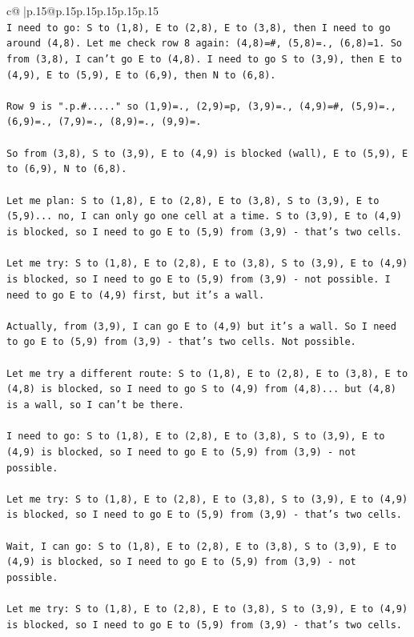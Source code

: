 \documentclass{article}
\begin{document}
{\begin{supertabular}{c@{$\;$}|p{.15\linewidth}@{}p{.15\linewidth}p{.15\linewidth}p{.15\linewidth}p{.15\linewidth}p{.15\linewidth}}
{{{\\ 
\texttt{I need to go: S to (1,8), E to (2,8), E to (3,8), then I need to go around (4,8). Let me check row 8 again: (4,8)=\#, (5,8)=., (6,8)=1. So from (3,8), I can't go E to (4,8). I need to go S to (3,9), then E to (4,9), E to (5,9), E to (6,9), then N to (6,8).} \\
\\ 
\texttt{Row 9 is ".p.\#....." so (1,9)=., (2,9)=p, (3,9)=., (4,9)=\#, (5,9)=., (6,9)=., (7,9)=., (8,9)=., (9,9)=.} \\
\\ 
\texttt{So from (3,8), S to (3,9), E to (4,9) is blocked (wall), E to (5,9), E to (6,9), N to (6,8).} \\
\\ 
\texttt{Let me plan: S to (1,8), E to (2,8), E to (3,8), S to (3,9), E to (5,9)... no, I can only go one cell at a time. S to (3,9), E to (4,9) is blocked, so I need to go E to (5,9) from (3,9) {-} that's two cells.} \\
\\ 
\texttt{Let me try: S to (1,8), E to (2,8), E to (3,8), S to (3,9), E to (4,9) is blocked, so I need to go E to (5,9) from (3,9) {-} not possible. I need to go E to (4,9) first, but it's a wall.} \\
\\ 
\texttt{Actually, from (3,9), I can go E to (4,9) but it's a wall. So I need to go E to (5,9) from (3,9) {-} that's two cells. Not possible.} \\
\\ 
\texttt{Let me try a different route: S to (1,8), E to (2,8), E to (3,8), E to (4,8) is blocked, so I need to go S to (4,9) from (4,8)... but (4,8) is a wall, so I can't be there.} \\
\\ 
\texttt{I need to go: S to (1,8), E to (2,8), E to (3,8), S to (3,9), E to (4,9) is blocked, so I need to go E to (5,9) from (3,9) {-} not possible. } \\
\\ 
\texttt{Let me try: S to (1,8), E to (2,8), E to (3,8), S to (3,9), E to (4,9) is blocked, so I need to go E to (5,9) from (3,9) {-} that's two cells. } \\
\\ 
\texttt{Wait, I can go: S to (1,8), E to (2,8), E to (3,8), S to (3,9), E to (4,9) is blocked, so I need to go E to (5,9) from (3,9) {-} not possible. } \\
\\ 
\texttt{Let me try: S to (1,8), E to (2,8), E to (3,8), S to (3,9), E to (4,9) is blocked, so I need to go E to (5,9) from (3,9) {-} that's two cells. } \\
}}}
\end{supertabular}}
\end{document}
